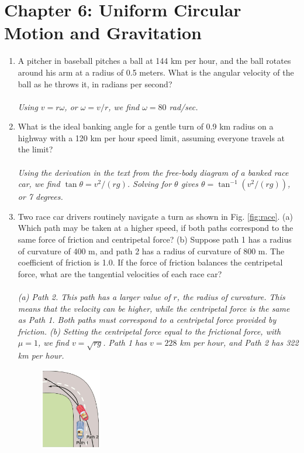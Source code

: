 \documentclass[10pt]{article}
\begin{document}
\section{Chapter 6: Uniform Circular Motion and Gravitation}

\begin{enumerate}
\item  A pitcher in baseball pitches a ball at 144 km per hour, and the ball rotates around his arm at a radius of 0.5 meters.  What is the angular velocity of the ball as he throws it, in radians per second? \\ \\
\textit{Using $v = r\omega$, or $\omega = v/r$, we find $\omega = 80$ rad/sec.}
\item What is the ideal banking angle for a gentle turn of 0.9 km radius on a highway with a 120 km per hour speed limit, assuming everyone travels at the limit? \\ \\
\textit{Using the derivation in the text from the free-body diagram of a banked race car, we find $\tan\theta = v^2/(rg)$.  Solving for $\theta$ gives $\theta = \tan^{-1}(v^2/(rg))$, or 7 degrees.}
\item Two race car drivers routinely navigate a turn as shown in Fig. \ref{fig:race}.  (a) Which path may be taken at a higher speed, if both paths correspond to the same force of friction and centripetal force? (b) Suppose path 1 has a radius of curvature of 400 m, and path 2 has a radius of curvature of 800 m.  The coefficient of friction is 1.0.  If the force of friction balances the centripetal force, what are the tangential velocities of each race car? \\ \\
\textit{(a) Path 2.  This path has a larger value of $r$, the radius of curvature.  This means that the velocity can be higher, while the centripetal force is the same as Path 1.  Both paths must correspond to a centripetal force provided by friction. (b) Setting the centripetal force equal to the frictional force, with $\mu = 1$, we find $v = \sqrt{r g}$.  Path 1 has $v = 228$ km per hour, and Path 2 has 322 km per hour.}
\begin{figure}[ht]
\centering
\includegraphics[width=0.25\textwidth]{race.png}

\end{figure}
\end{enumerate}
\end{document}

